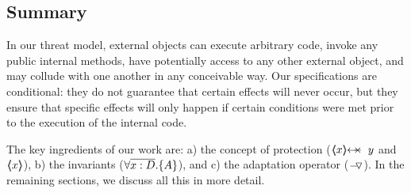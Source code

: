 \subsection*{Summary}

In our threat model, external objects can execute arbitrary code, invoke any public internal methods, have potentially access to any other external object, and may collude with one another  in any conceivable way.
Our specifications are conditional: they do not guarantee that certain effects will never occur, but they ensure that specific effects will only happen if certain conditions were met prior to the execution of the internal code.
 
The key ingredients of our work are: a) the concept of protection ($\protectedFrom {x} {y}$ and $\langle\!\!\langle x \rangle\!\!\rangle$), b) the \scoped invariants (${\forall {\overline {x:D}}.{{\{}}{A}{{\}}}}$), and c) the adaptation operator ($ { } \!-\!\!\!\,\!{\triangledown} { } $).
In the remaining sections, we discuss all this in more detail.

 

 

 
 
